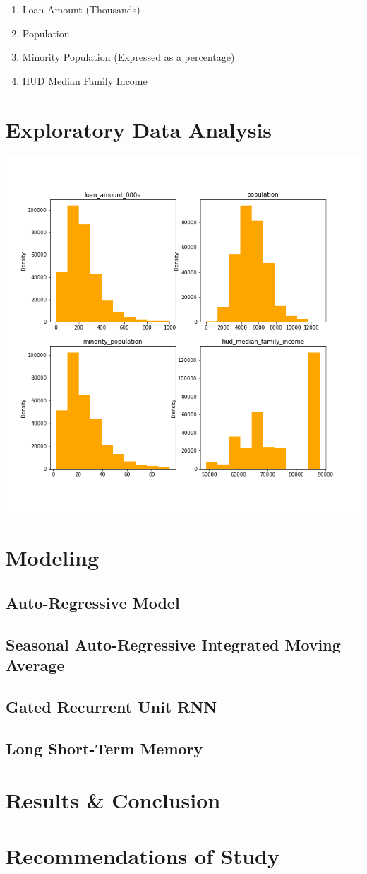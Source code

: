\documentclass{article}
\begin{document}
	\begin{enumerate}
		\item Loan Amount (Thousands)
		\item Population 
		\item Minority Population (Expressed as a percentage)
		\item HUD Median Family Income 
	\end{enumerate}

	\section{Exploratory Data Analysis}
	
	\includegraphics[scale = 0.5]{../plots/hmda_hist.png}
	
	\section{Modeling}
	\subsection{Auto-Regressive Model}
	\subsection{Seasonal Auto-Regressive Integrated Moving Average}
	\subsection{Gated Recurrent Unit RNN}
	\subsection{Long Short-Term Memory}
	\section{Results \& Conclusion}
	\section{Recommendations of Study}
	
\end{document}
